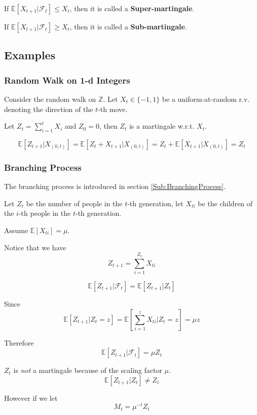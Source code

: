         \begin{remark}
            If $\mathbb{E}[X_{t+1}|\mathcal{F}_t] \le X_t$, then it is called a \textbf{Super-martingale}.

            If $\mathbb{E}[X_{t+1}|\mathcal{F}_t] \ge X_t$, then it is called a \textbf{Sub-martingale}.
        \end{remark}

    \subsection{Examples}
        \subsubsection{Random Walk on 1-d Integers}
        Consider the random walk on $\mathbb{Z}$. Let $X_t \in \{-1, 1\}$ be a uniform-at-random r.v. denoting the direction of the $t$-th move.

        Let $Z_t = \sum_{i=1}^tX_i$ and $Z_0=0$, then $Z_t$ is a martingale w.r.t. $X_t$.

        \[ \mathbb{E}[Z_{t+1}|X_{(0,t)}] = \mathbb{E}[Z_t + X_{t+1}|X_{(0,t)}] = Z_t + \mathbb{E}[X_{t+1}|X_{(0,t)}] = Z_t \]

        \subsubsection{Branching Process}
        The branching process is introduced in section \ref{Sub:BranchingProcess}.

        Let $Z_t$ be the number of people in the $t$-th generation, let $X_{ti}$ be the children of the $i$-th people in the $t$-th generation.

        Assume $\mathbb{E}[X_{ti}] = \mu$.

        Notice that we have
        \[ Z_{t+1} = \sum_{i=1}^{Z_t}X_{ti} \]

        \[ \mathbb{E}[Z_{t+1}|\mathcal{F}_t] = \mathbb{E}[Z_{t+1}|Z_t] \]

        Since
        \[ \mathbb{E}[Z_{t+1}|Z_t=z] = \mathbb{E}[\sum_{i=1}^zX_{ti}|Z_t=z] = \mu z \]

        Therefore
        \[ \mathbb{E}[Z_{t+1}|\mathcal{F}_t] = \mu Z_t \]

        $Z_t$ is \emph{not} a martingale because of the scaling factor $\mu$.
        \[ \mathbb{E}[Z_{t+1}|Z_t] \neq Z_t \]

        However if we let
        \[ M_t = \mu^{-t}Z_t \]

